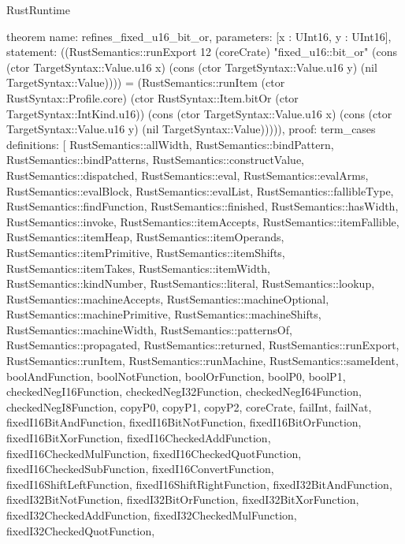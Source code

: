 \begin{lexlean}{RustRuntime}
\begin{semanticmodule}
theorem{
  name: refines_fixed_u16_bit_or,
  parameters: [x : UInt16, y : UInt16],
  statement: ((RustSemantics::runExport 12 (coreCrate) "fixed_u16::bit_or" (cons (ctor TargetSyntax::Value.u16 x) (cons (ctor TargetSyntax::Value.u16 y) (nil TargetSyntax::Value)))) = (RustSemantics::runItem (ctor RustSyntax::Profile.core) (ctor RustSyntax::Item.bitOr (ctor TargetSyntax::IntKind.u16)) (cons (ctor TargetSyntax::Value.u16 x) (cons (ctor TargetSyntax::Value.u16 y) (nil TargetSyntax::Value))))),
  proof: term_cases{
    definitions: [
      RustSemantics::allWidth,
      RustSemantics::bindPattern,
      RustSemantics::bindPatterns,
      RustSemantics::constructValue,
      RustSemantics::dispatched,
      RustSemantics::eval,
      RustSemantics::evalArms,
      RustSemantics::evalBlock,
      RustSemantics::evalList,
      RustSemantics::fallibleType,
      RustSemantics::findFunction,
      RustSemantics::finished,
      RustSemantics::hasWidth,
      RustSemantics::invoke,
      RustSemantics::itemAccepts,
      RustSemantics::itemFallible,
      RustSemantics::itemHeap,
      RustSemantics::itemOperands,
      RustSemantics::itemPrimitive,
      RustSemantics::itemShifts,
      RustSemantics::itemTakes,
      RustSemantics::itemWidth,
      RustSemantics::kindNumber,
      RustSemantics::literal,
      RustSemantics::lookup,
      RustSemantics::machineAccepts,
      RustSemantics::machineOptional,
      RustSemantics::machinePrimitive,
      RustSemantics::machineShifts,
      RustSemantics::machineWidth,
      RustSemantics::patternsOf,
      RustSemantics::propagated,
      RustSemantics::returned,
      RustSemantics::runExport,
      RustSemantics::runItem,
      RustSemantics::runMachine,
      RustSemantics::sameIdent,
      boolAndFunction,
      boolNotFunction,
      boolOrFunction,
      boolP0,
      boolP1,
      checkedNegI16Function,
      checkedNegI32Function,
      checkedNegI64Function,
      checkedNegI8Function,
      copyP0,
      copyP1,
      copyP2,
      coreCrate,
      failInt,
      failNat,
      fixedI16BitAndFunction,
      fixedI16BitNotFunction,
      fixedI16BitOrFunction,
      fixedI16BitXorFunction,
      fixedI16CheckedAddFunction,
      fixedI16CheckedMulFunction,
      fixedI16CheckedQuotFunction,
      fixedI16CheckedSubFunction,
      fixedI16ConvertFunction,
      fixedI16ShiftLeftFunction,
      fixedI16ShiftRightFunction,
      fixedI32BitAndFunction,
      fixedI32BitNotFunction,
      fixedI32BitOrFunction,
      fixedI32BitXorFunction,
      fixedI32CheckedAddFunction,
      fixedI32CheckedMulFunction,
      fixedI32CheckedQuotFunction,
}}
\end{semanticmodule}
\end{lexlean}
